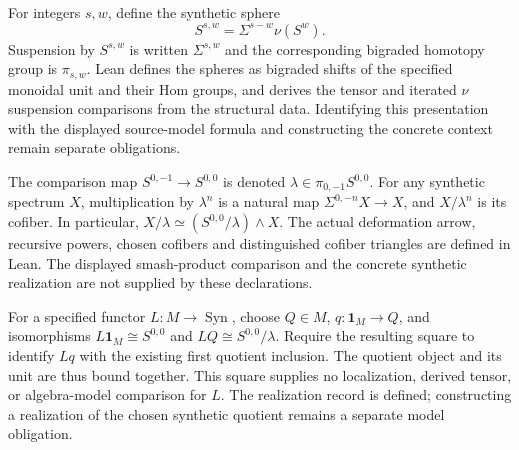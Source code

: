 \begin{definition}
  \label{def:synthetic-sphere}
  \notready
  For integers $s,w$, define the synthetic sphere
  \[
    S^{s,w}=\Sigma^{s-w}\nu(S^w).
  \]
  Suspension by $S^{s,w}$ is written $\Sigma^{s,w}$ and the corresponding
  bigraded homotopy group is $\pi_{s,w}$.
  Lean defines the spheres as bigraded shifts of the specified monoidal
  unit and their Hom groups, and derives the tensor and iterated $\nu$
  suspension comparisons from the structural data. Identifying this
  presentation with the displayed source-model formula and constructing
  the concrete context remain separate obligations.
\end{definition}

\begin{definition}
  \label{def:synthetic-lambda-quotient}
  \notready
  The comparison map $S^{0,-1}\to S^{0,0}$ is denoted
  $\lambda\in\pi_{0,-1}S^{0,0}$.  For any synthetic spectrum $X$, multiplication
  by $\lambda^n$ is a natural map
  $\Sigma^{0,-n}X\to X$, and $X/\lambda^n$ is its cofiber.  In particular,
  $X/\lambda\simeq(S^{0,0}/\lambda)\mathbin{\wedge}X$.
  The actual deformation arrow, recursive powers, chosen cofibers and
  distinguished cofiber triangles are defined in Lean. The displayed
  smash-product comparison and the concrete synthetic realization are
  not supplied by these declarations.
\end{definition}

\begin{definition}
  \label{def:lambda-quotient-realization}
  \leanok
  For a specified functor $L:M\to\operatorname{Syn}$, choose $Q\in M$,
  $q:\mathbf1_M\to Q$, and isomorphisms
  $L\mathbf1_M\cong S^{0,0}$ and $LQ\cong S^{0,0}/\lambda$.
  Require the resulting square to identify $Lq$ with the existing first
  quotient inclusion. The quotient object and its unit are thus bound
  together. This square supplies no localization, derived tensor, or
  algebra-model comparison for $L$. The realization record is defined;
  constructing a realization of the chosen synthetic quotient remains
  a separate model obligation.
\end{definition}

